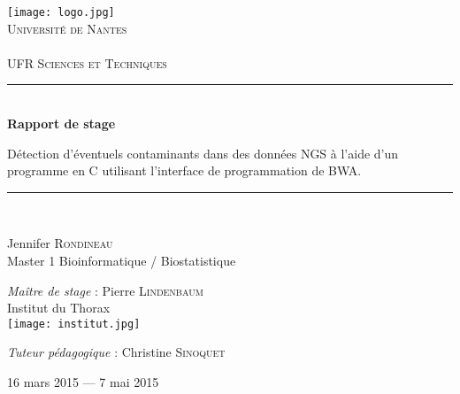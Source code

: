 \setlength{\parindent}{0cm}
\setlength{\parskip}{1ex plus 0.5ex minus 0.2ex}
\newcommand{\hsp}{\hspace{20pt}}
\newcommand{\HRule}{\rule{\linewidth}{0.5mm}}
\begin{titlepage}
  \begin{sffamily}
  \begin{center}

    \texttt{[image: logo.jpg]}~\\[1.5cm]

    \textsc{\LARGE Université de Nantes}\\
    \textsc{\LARGE  }\\
    \textsc{\Large UFR Sciences et Techniques}\\[1.5cm]

    \HRule \\[0.4cm]
    { \huge \bfseries Rapport de stage\\[0.4cm]
     }
     \begin{center}
		Détection d'éventuels contaminants dans des données NGS à l'aide d'un programme en C utilisant l'interface de programmation de BWA.
	\end{center}
    \HRule \\[0.4cm]

    
      \begin{center} \large
       Jennifer \textsc{Rondineau}\\
       Master 1 Bioinformatique / Biostatistique \\
      \end{center}
      \begin{center} \large
		\emph{Maître de stage} : Pierre \textsc{Lindenbaum}\\
		Institut du Thorax\ \\[1.5]
		\texttt{[image: institut.jpg]}\\[1.5]
      \end{center}
      \begin{center} \large
		\emph{Tuteur pédagogique} : Christine \textsc{Sinoquet} \\
      \end{center}

    \vfill

    {\large 16 mars 2015 — 7 mai 2015}

  \end{center}
  \end{sffamily}
\end{titlepage}
